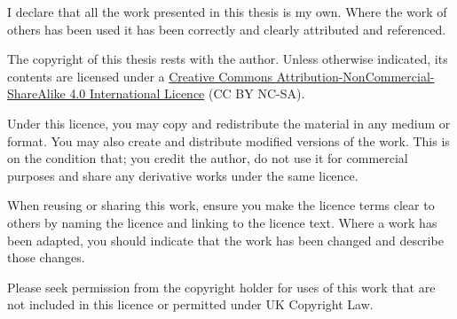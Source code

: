 I declare that all the work presented in this thesis is my own. Where the work
of others has been used it has been correctly and clearly attributed and
referenced.

The copyright of this thesis rests with the author. Unless otherwise indicated,
its contents are licensed under a
\href{https://creativecommons.org/licenses/by-nc-sa/4.0/}{Creative Commons
Attribution-NonCommercial-ShareAlike 4.0 International Licence} (CC BY NC-SA).

Under this licence, you may copy and redistribute the material in any medium or
format. You may also create and distribute modified versions of the work. This
is on the condition that; you credit the author, do not use it for commercial
purposes and share any derivative works under the same licence.

When reusing or sharing this work, ensure you make the licence terms clear to
others by naming the licence and linking to the licence text. Where a work has
been adapted, you should indicate that the work has been changed and describe
those changes.

Please seek permission from the copyright holder for uses of this work that are
not included in this licence or permitted under UK Copyright Law.

